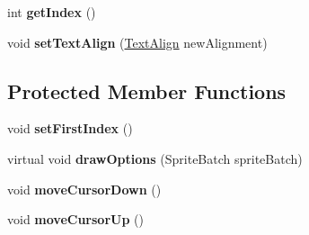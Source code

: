 \begin{DoxyCompactItemize}
\item 
\hypertarget{class_simple_r_p_g_1_1_windows_1_1_list_box_a4abd9037503be834ae7a194bd1449999}{int {\bfseries get\-Index} ()}\label{class_simple_r_p_g_1_1_windows_1_1_list_box_a4abd9037503be834ae7a194bd1449999}

\item 
\hypertarget{class_simple_r_p_g_1_1_windows_1_1_list_box_a830d5ae33e0866b2f2c9c712cec51510}{void {\bfseries set\-Text\-Align} (\hyperlink{namespace_simple_r_p_g_a956c6a011833191ccb1b0aa38a1d5916}{Text\-Align} new\-Alignment)}\label{class_simple_r_p_g_1_1_windows_1_1_list_box_a830d5ae33e0866b2f2c9c712cec51510}

\end{DoxyCompactItemize}
\subsection*{Protected Member Functions}
\begin{DoxyCompactItemize}
\item 
\hypertarget{class_simple_r_p_g_1_1_windows_1_1_list_box_a210c6cdcd777e69676153e318e2cf565}{void {\bfseries set\-First\-Index} ()}\label{class_simple_r_p_g_1_1_windows_1_1_list_box_a210c6cdcd777e69676153e318e2cf565}

\item 
\hypertarget{class_simple_r_p_g_1_1_windows_1_1_list_box_a2005eacdc6532a13a25933f880e5ede1}{virtual void {\bfseries draw\-Options} (Sprite\-Batch sprite\-Batch)}\label{class_simple_r_p_g_1_1_windows_1_1_list_box_a2005eacdc6532a13a25933f880e5ede1}

\item 
\hypertarget{class_simple_r_p_g_1_1_windows_1_1_list_box_a4c2195c09a0f158c667c7cfcf802ff48}{void {\bfseries move\-Cursor\-Down} ()}\label{class_simple_r_p_g_1_1_windows_1_1_list_box_a4c2195c09a0f158c667c7cfcf802ff48}

\item 
\hypertarget{class_simple_r_p_g_1_1_windows_1_1_list_box_a499a5c3c093ceae369ab8572cad411ab}{void {\bfseries move\-Cursor\-Up} ()}\label{class_simple_r_p_g_1_1_windows_1_1_list_box_a499a5c3c093ceae369ab8572cad411ab}

\end{DoxyCompactItemize}
